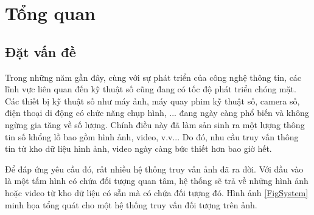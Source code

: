 
\chapter{Tổng quan}
\ifpdf
    \graphicspath{{Chapter1/Chapter1Figs/PNG/}{Chapter1/Chapter1Figs/PDF/}{Chapter1/Chapter1Figs/}}
\else
    \graphicspath{{Chapter1/Chapter1Figs/EPS/}{Chapter1/Chapter1Figs/}}
\fi
{}
\section{Đặt vấn đề}
Trong những năm gần đây, cùng với sự phát triển của công nghệ thông tin, các lĩnh vực liên quan đến kỹ thuật số cũng đang có tốc độ phát triển chóng mặt. Các thiết bị kỹ thuật số như máy ảnh, máy quay phim kỹ thuật số, camera số, điện thoại di động có chức năng chụp hình, ... đang ngày càng phổ biến và không ngừng gia tăng về số lượng. Chính điều này đã làm sản sinh ra một lượng thông tin số khổng lồ bao gồm hình ảnh, video, v.v... Do đó, nhu cầu truy vấn thông tin từ kho dữ liệu hình ảnh, video ngày càng bức thiết hơn bao giờ hết.

Để đáp ứng yêu cầu đó, rất nhiều hệ thống truy vấn ảnh đã ra đời. Với đầu vào là một tấm hình có chứa đối tượng quan tâm, hệ thống sẽ trả về những hình ảnh hoặc video từ kho dữ liệu có sẵn mà có chứa đối tượng đó. Hình ảnh \ref{FigSystem} minh họa tổng quát cho một hệ thống truy vấn đối tượng trên ảnh.

